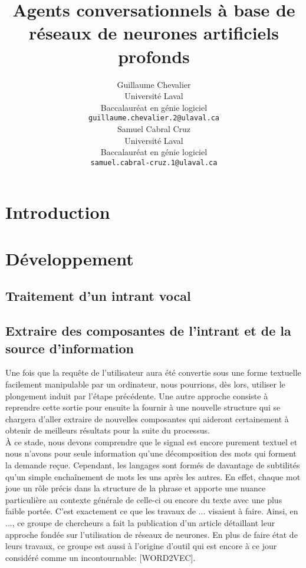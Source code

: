 \documentclass[11pt]{article}
\title{Agents conversationnels à base de réseaux de neurones artificiels profonds}
\author{Guillaume Chevalier \\
  Université Laval \\ Baccalauréat en génie logiciel \\
  {\tt \small guillaume.chevalier.2@ulaval.ca} \\\And
  Samuel Cabral Cruz \\
  Université Laval \\ Baccalauréat en génie logiciel \\
  {\tt \small samuel.cabral-cruz.1@ulaval.ca} \\}
\date{}
\begin{document}
\maketitle

\begin{abstract}

\end{abstract}

\section{Introduction}


\section{Développement}
\subsection{Traitement d'un intrant vocal}

\subsection{Extraire des composantes de l'intrant et de la source d'information}
Une fois que la requête de l'utilisateur aura été convertie sous une forme textuelle facilement manipulable par un ordinateur, nous pourrions, dès lors, utiliser le plongement induit par l'étape précédente. Une autre approche consiste à reprendre cette sortie pour ensuite la fournir à une nouvelle structure qui se chargera d'aller extraire de nouvelles composantes qui aideront certainement à obtenir de meilleurs résultats pour la suite du processus. \\

À ce stade, nous devons comprendre que le signal est encore purement textuel et nous n'avons pour seule information qu'une décomposition des mots qui forment la demande reçue. Cependant, les langages sont formés de davantage de subtilités qu'un simple enchaînement de mots les uns après les autres. En effet, chaque mot joue un rôle précis dans la structure de la phrase et apporte une nuance particulière au contexte générale de celle-ci ou encore du texte avec une plus faible portée. C'est exactement ce que les travaux de ... visaient à faire. Ainsi, en ..., ce groupe de chercheurs a fait la publication d'un article détaillant leur approche fondée sur l'utilisation de réseaux de neurones. En plus de faire état de leurs travaux, ce groupe est aussi à l'origine d'outil qui est encore à ce jour considéré comme un incontournable: [WORD2VEC]. \\
\end{document}
